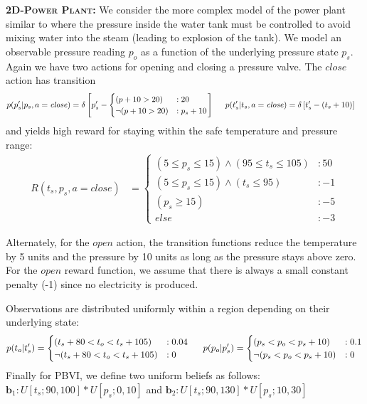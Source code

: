 \documentclass{article} %
\renewcommand{\vec}[1]{\mathbf{#1}} %
\newcommand{\open}{\mathit{open}}
\newcommand{\close}{\mathit{close}}
\begin{document}
{\bf \textsc{\bf 2D-Power Plant}:} We consider the more complex model
of the power plant similar to \cite{steam2} where the pressure inside
the water tank must be controlled to avoid mixing water into the steam
(leading to explosion of the tank).  We model an observable pressure
reading $p_o$ as a function of the underlying pressure state $p_s$.
Again we have two actions for opening and closing a pressure valve.
The $\close$ action has transition 
{\footnotesize
\begin{align}
p(p_s'|p_s,a=\close)&= \delta\left[ p_s' - 
\begin{cases}
 (p+10> 20) &: 20 \\ 
\neg (p+10> 20) &: p_s + 10 \\
\end{cases}
\right]\nonumber
\hspace{5mm} 
p(t_s'|t_s,a=\close)= \delta\left[ t_s' - (t_s +10) \right]\nonumber
\end{align}
}
and yields high reward for staying within the 
safe temperature and pressure range:
{\footnotesize
\vspace{-1mm}
\begin{align}
R(t_s,p_s,a=\close) &= 
\begin{cases}
(5 \leq p_s \leq 15)\wedge (95 \leq t_s \leq 105)&:50\\
(5 \leq p_s \leq 15)\wedge (t_s \leq 95)&: -1\\
(p_s \geq 15) &: -5\\ 
else &: -3
\end{cases}\nonumber
\end{align}
\vspace{-4mm}
}

Alternately, for the $\open$ action, the transition functions reduce
the temperature by 5 units and the pressure by 10 units as long as the
pressure stays above zero. For the $\open$ reward function, we assume
that there is always a small constant penalty (-1) since no electricity
is produced.

Observations are distributed uniformly within a region depending on
their underlying state:
{\footnotesize
\begin{align}
p(t_o|t_s') = 
\begin{cases}
(t_s + 80<t_o<t_s+ 105) &: 0.04 \\
 \neg (t_s + 80<t_o<t_s+ 105) &: 0 \\
\end{cases}\nonumber
\hspace{5mm} 
p(p_o|p_s') = 
\begin{cases}
(p_s<p_o<p_s+10) &: 0.1 \\
 \neg(p_s<p_o<p_s+10) &: 0 \\
\end{cases}\nonumber
\end{align}
}
Finally for PBVI, we define two uniform beliefs as follows: 
$\vec{b}_1: U[t_s;90,100]*U[p_s;0,10]$ and $\vec{b}_2: U[t_s;90,130]*U[p_s;10,30]$
\end{document}
